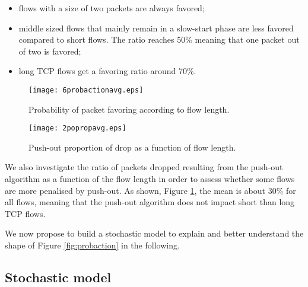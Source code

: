 \documentclass{elsart}
\begin{document}
\begin{itemize}
\item flows with a size of two packets are always favored; 
\item middle sized flows that mainly remain in a slow-start phase are less favored compared to short flows. The ratio reaches 50\% meaning that one packet out of two is favored; 
\item long TCP flows get a favoring ratio around 70\%. 
\end{itemize} 

\begin{figure}[htb!]
   \begin{minipage}[b]{1.0\columnwidth}
	\centering
	\texttt{[image: 6probactionavg.eps]}
	\caption{Probability of packet favoring according to flow length.}
	\label{fig:probaction}
   \end{minipage}

   \begin{minipage}[b]{1.0\columnwidth}   
	\centering
	\texttt{[image: 2popropavg.eps]}
	\caption{Push-out proportion of drop as a function of flow length.}
	\label{fig:propo}
   \end{minipage}
\end{figure}

We also investigate the ratio of packets dropped resulting from the push-out algorithm as a function of the flow length in order to assess whether some flows are more penalised by push-out.
As shown, Figure \ref{fig:propo}, the mean is about 30\% for all flows, meaning that the push-out algorithm does not impact short than long TCP flows.

We now propose to build a stochastic model to explain and better understand the shape of Figure \ref{fig:probaction} in the following.


\subsection{Stochastic model}
\end{document}
